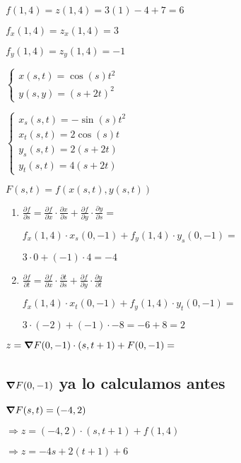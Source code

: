 \documentclass[../parcial.tex]{subfiles}
\begin{document}
    $ f(1,4) = z(1,4) = 3(1) - 4 + 7 = 6$

    $ f_x(1,4) = z_x(1,4) = 3$

    $ f_y(1,4) = z_y(1,4) = -1$

    $ \left\{
        \begin{array}{ll}
            x(s,t) = \cos(s)t^2 \\
            y(s,y) = (s+2t)^2
        \end{array}
    \right.$

    $ \left\{
        \begin{array}{ll}
            x_s(s,t) = -\sin(s)t^2 \\
            x_t(s,t) = 2\cos(s)t \\
            y_s(s,t) = 2(s+2t)\\
            y_t(s,t) = 4(s+2t)
        \end{array}
    \right.$

    $F(s,t) = f(x(s,t),y(s,t))$

    \begin{enumerate}
        \item $\frac{\partial f}{\partial s} = \frac{\partial f}{\partial x} \cdot \frac{\partial x}{\partial s} + \frac{\partial f}{\partial y} \cdot \frac{\partial y}{\partial s} = $
        
            $f_x(1,4)\cdot x_s(0,-1) + f_y(1,4) \cdot y_s(0,-1) = $

            $3 \cdot 0 + (-1) \cdot 4 = -4$

        \item $\frac{\partial f}{\partial t} = \frac{\partial f}{\partial x} \cdot \frac{\partial t}{\partial s} + \frac{\partial f}{\partial y} \cdot \frac{\partial y}{\partial t}$
        
            $f_x(1,4)\cdot x_t(0,-1) + f_y(1,4) \cdot y_t(0,-1) = $

            $3\cdot (-2) + (-1) \cdot -8 = -6 + 8 = 2 $

    \end{enumerate}

    $ z = \grad F(0,-1)\cdot(s,t+1) + F(0,-1) = $

    \subsection*{$\grad F(0,-1)$ ya lo calculamos antes}

    $ \grad F(s,t) = (-4, 2) $

    $\Rightarrow z = (-4,2)\cdot(s,t+1) + f(1,4)$

    $\Rightarrow z = -4s +2(t+1) + 6$
\end{document}
